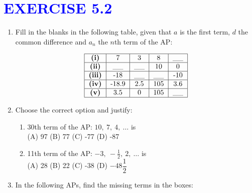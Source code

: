 \documentclass[12pt]{article}
\begin{document}
\section*{\textcolor{blue}{\large EXERCISE 5.2}}
\begin{enumerate}
\item Fill in the blanks in the following table, given that \( a \) is the first term, \( d \) the common difference and \( a_n \) the \( n \)th term of the AP:

\[
\begin{tabular}{|c|c|c|c|c|}
\hline
\textbf{(i)} & 7 & 3 & 8 & \_\_ \\
\hline
\textbf{(ii)} & \_\_ & \_\_ & 10 & 0 \\
\hline
\textbf{(iii)} & -18 & \_\_ & \_\_ & -10 \\
\hline
\textbf{(iv)} & -18.9 & 2.5 & 105 & 3.6 \\
\hline
\textbf{(v)} & 3.5 & 0 & 105 & \_\_ \\
\hline
\end{tabular}
\]

\item Choose the correct option and justify:

\begin{enumerate}[label=(\alph*)]
    \item 30th term of the AP: \( 10,\ 7,\ 4,\ \ldots \) is\\
    (A) 97 \quad (B) 77 \quad (C) -77 \quad (D) -87

    \item 11th term of the AP: \( -3,\ -\frac{1}{2},\ 2,\ \ldots \) is\\
    (A) 28 \quad (B) 22 \quad (C) -38 \quad (D) $-48\dfrac{1}{2}$
\end{enumerate}



\item In the following APs, find the missing terms in the boxes:


\end{enumerate}
\end{document}

